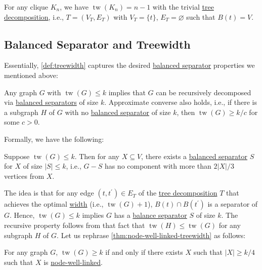 \begin{eg}[Clique]
	For any clique \(K_n\), we have \(\operatorname{tw}(K_n) = n-1\) with the trivial \hyperref[def:tree-decomposition]{tree decomposition}, i.e., \(T = (V_T, E_T)\) with \(V_T = \{ t \} \), \(E_T = \varnothing \) such that \(B(t) = V\).
\end{eg}

\subsection{Balanced Separator and Treewidth}
Essentially, \autoref{def:treewidth} captures the desired \hyperref[def:balanced-separator]{balanced separator} properties we mentioned above:

\begin{intuition}
	Any graph \(G\) with \(\operatorname{tw}(G) \leq k\) implies that \(G\) can be recursively decomposed via \hyperref[def:balanced-separator]{balanced separators} of size \(k\). Approximate converse also holds, i.e., if there is a subgraph \(H\) of \(G\) with no \hyperref[def:balanced-separator]{balanced separator} of size \(k\), then \(\operatorname{tw}(G) \geq k / c\) for some \(c > 0\).
\end{intuition}

Formally, we have the following:

\begin{lemma}
	Suppose \(\operatorname{tw}(G) \leq k\). Then for any \(X \subseteq V\), there exists a \hyperref[def:balanced-separator]{balanced separator} \(S\) for \(X\) of size \(\lvert S \rvert \leq k\), i.e., \(G-S\) has no component with more than \(2 \lvert X \rvert / 3\) vertices from \(X\).
\end{lemma}

The idea is that for any edge \((t, t^{\prime} ) \in E_T\) of the \hyperref[def:tree-decomposition]{tree decomposition} \(T\) that achieves the optimal \hyperref[def:tree-decomposition-width]{width} (i.e., \(\operatorname{tw}(G) + 1\)), \(B(t) \cap B(t^{\prime} )\) is a separator of \(G\). Hence, \(\operatorname{tw}(G) \leq k \) implies \(G\) has a \hyperref[def:balanced-separator]{balance separator} \(S\) of size \(k\). The recursive property follows from that fact that \(\operatorname{tw}(H) \leq \operatorname{tw}(G) \) for any subgraph \(H\) of \(G\). Let us rephrase \autoref{thm:node-well-linked-treewidth} as follows:

\begin{lemma}\label{lma:node-well-linked-treewidth}
	For any graph \(G\), \(\operatorname{tw}(G) \geq k\) if and only if there exists \(X\) such that \(\lvert X \rvert \geq k / 4\) such that \(X\) is \hyperref[def:node-well-linked]{node-well-linked}.
\end{lemma}

